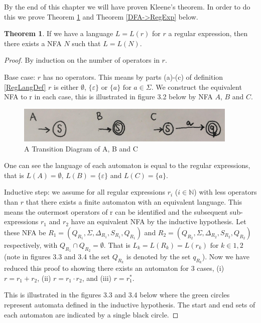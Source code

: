 \documentclass[a4paper,12pt]{report}
\theoremstyle{definition}
\newtheorem{theorem}{Theorem}[chapter]
\begin{document}
By the end of this chapter we will have proven Kleene's theorem. In order to do this we prove Theorem \ref{RegEx->DFA} and Theorem \ref{DFA->RegExp} below. 

\begin{theorem}
\label{RegEx->DFA}
If we have a language $L=L(r)$ for $r$ a regular expression, then there exists a NFA $N$ such that $L=L(N)$.
\end{theorem}

\begin{proof}
By induction on the number of operators in $r$.

Base case: $r$ has no operators. This means by parts (a)-(c) of definition \ref{RegLangDef} $r$ is either $\emptyset$, $\{\varepsilon\}$ or $\{a\}\text{ for } a \in\Sigma$. We construct the equivalent NFA to r in each case, this is illustrated in figure 3.2 below by NFA $A$, $B$ and $C$.
\begin{figure}[ht]
\centering
\includegraphics[width=400px]{figure1.4.jpg}
\caption{A Transition Diagram of A, B and C}
\label{image-Figure4}
\end{figure}

One can see the language of each automaton is equal to the regular expressions, that is $L(A)=\emptyset$, $L(B)=\{\varepsilon\}$ and $L(C)=\{a\}$.

Inductive step: we assume for all regular expressions $ r_i$ ($i\in\mathbb{N}$) with less operators than $r$ that there exists a finite automaton with an equivalent language. 
This means the outermost operators of r can be identified and the subsequent sub-expressions $r_1$ and $r_2$ have an equivalent NFA by the inductive hypothesis. Let these NFA be  $R_1=(Q_{R_1},\Sigma,\Delta_{R_1},S_{R_1},Q_{R_1})$ and $R_2=(Q_{R_2},\Sigma,\Delta_{R_2},S_{R_2},Q_{R_2})$ respectively, with $Q_{R_1} \cap Q_{R_2}=\emptyset$. That is $L_k = L(R_k)=L(r_k) \text{ for } k\in{1,2}$ (note in figures 3.3 and 3.4 the set $Q_{R_k}$ is denoted by the set $q_{R_k}$). Now we have reduced this proof to showing there exists an automaton for 3 cases, 
(i) $r= r_1 + r_2$,
(ii) $r = r_1 \cdot r_2$, and
(iii) $r=r_1 ^*$.

This is illustrated in the figures 3.3 and 3.4 below where the green circles represent automata defined in the inductive hypothesis. The start and end sets of each automaton are indicated by a single black circle.


\end{proof}
\end{document}
